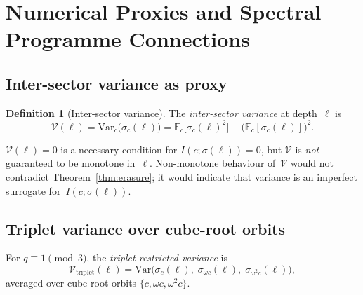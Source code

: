 \documentclass[11pt,a4paper]{article}
\theoremstyle{plain}
\theoremstyle{definition}
\newtheorem{definition}[theorem]{Definition}
\theoremstyle{remark}
\begin{document}
  \section{Numerical Proxies and Spectral Programme Connections}
  \label{sec:numerics}

  \subsection{Inter-sector variance as proxy}

    \begin{definition}[Inter-sector variance]
      \label{def:variance}
      The \emph{inter-sector variance} at depth~$\ell$ is
      \begin{equation}
        \label{eq:variance}
        \mathcal{V}(\ell)
        = \mathrm{Var}_c\bigl(\sigma_c(\ell)\bigr)
        = \mathbb{E}_c\bigl[\sigma_c(\ell)^2\bigr]
        - \bigl(\mathbb{E}_c[\sigma_c(\ell)]\bigr)^2.
      \end{equation}
    \end{definition}

    $\mathcal{V}(\ell) = 0$ is a necessary condition for $I(c;\sigma(\ell)) = 0$,
    but $\mathcal{V}$ is \emph{not} guaranteed to be monotone in~$\ell$.
    Non-monotone behaviour of~$\mathcal{V}$ would not contradict Theorem~\ref{thm:erasure};
    it would indicate that variance is an imperfect surrogate for~$I(c;\sigma(\ell))$.

  \subsection{Triplet variance over cube-root orbits}

    For $q \equiv 1 \pmod{3}$, the \emph{triplet-restricted variance} is
    \begin{equation}
      \label{eq:tripvar}
      \mathcal{V}_{\mathrm{triplet}}(\ell)
      = \mathrm{Var}\bigl(\sigma_c(\ell),\;
      \sigma_{\omega c}(\ell),\; \sigma_{\omega^2 c}(\ell)\bigr),
    \end{equation}
    averaged over cube-root orbits $\{c, \omega c, \omega^2 c\}$.
\end{document}
